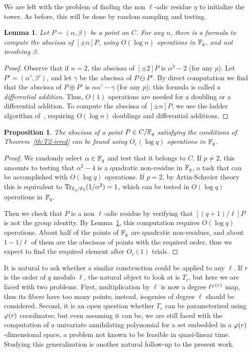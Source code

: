 \documentclass{sig-alternate}
\newtheorem{lemma}[definition]{Lemma}
\newtheorem{proposition}[definition]{Proposition}
\begin{document}
We are left with the problem of finding the non $\ell$-adic residue
$\eta$ to initialize the tower. As before, this will be done by random
sampling and testing.

\begin{lemma}
  \label{th:montgomery}
  Let $P=(\alpha,\beta)$ be a point on $C$. For any $n$, there is a
  formula to compute the abscissa of $[\pm n]P$, using $O(\log n)$
  operations in $\mathbb{F}_q$, and not involving $\beta$.
\end{lemma}
\begin{proof}
  Observe that if $n=2$, the abscissa of $[\pm 2]P$ is $\alpha^2-2$
  (for any $p$).  Let $P'=(\alpha',\beta')$, and let $\gamma$ be the
  abscissa of $P\ominus P'$. By direct computation we find that the
  abscissa of $P\oplus P'$ is $\alpha\alpha'-\gamma$ (for any $p$);
  this formula is called a \emph{differential addition}.  Thus, $O(1)$
  operations are needed for a doubling or a differential addition. To
  compute the abscissa of $[\pm n]P$, we use the ladder algorithm
  of~\cite{montgomery}, requiring $O(\log n)$ doublings and
  differential additions.
\end{proof}

\begin{proposition}
  The abscissa of a point $P\in C/\mathbb{F}_q$ satisfying the
  conditions of Theorem~\ref{th:T2-irred} can be found using $O_e(\log
  q)$ operations in $\mathbb{F}_q$.
\end{proposition}
\begin{proof}
  We randomly select $\alpha\in\mathbb{F}_q$ and test that it belongs to
  $C$. If $p\ne2$, this amounts to testing that $\alpha^2-4$ is a
  quadratic non-residue in $\mathbb{F}_q$, a task that can be accomplished
  with $O(\log q)$ operations. If $p=2$, by Artin-Schreier theory this
  is equivalent to $\operatorname{Tr}_{\mathbb{F}_q/\mathbb{F}_2}(1/\alpha^2)=1$, which can be
  tested in $O(\log q)$ operations in $\mathbb{F}_q$.

  Then we check that $P$ is a non $\ell$-adic residue by verifying
  that $[(q+1)/\ell]P$ is not the group identity. By
  Lemma~\ref{th:montgomery}, this computation requires $O(\log q)$
  operations.
  About half of the points of $\mathbb{F}_q$ are quadratic non-residues, and
  about $1-1/\ell$ of them are the abscissas of points with the
  required order, thus we expect to find the required element after
  $O_e(1)$ trials.
\end{proof}

It is natural to ask whether a similar construction could be applied
to any $\ell$. If $r$ is the order of $q$ modulo $\ell$, the natural
object to look at is $T_r$, but here we are faced with two
problems. First, multiplication by $\ell$ is now a degree
$\ell^{\varphi(r)}$ map, thus its fibers have too many points; instead,
isogenies of degree $\ell$ should be considered. Second, it is an open
question whether $T_r$ can be parameterized using $\varphi(r)$
coordinates; but even assuming it can be, we are still faced with the
computation of a univariate annihilating polynomial for a set embedded
in a $\varphi(r)$-dimensional space, a problem not known to be feasible
in quasi-linear time. Studying this generalization is another natural
follow-up to the present work.
\end{document}
